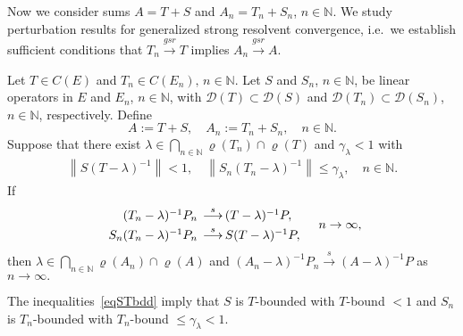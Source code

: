 \documentclass[a4paper,reqno]{amsart}
\begin{document}
{Now we consider sums $A=T+S$ and $A_n=T_n+S_n$, $n\in{\mathbb{N}}$.
We study perturbation results for generalized strong resolvent convergence, i.e.\ we establish sufficient conditions that $T_n{\stackrel{gsr}{\rightarrow}} T$ implies $A_n{\stackrel{gsr}{\rightarrow}} A$.

\begin{theorem}\label{perturbgsr}
Let $T\in C(E)$ and $T_n\in C(E_n), \,n\in{\mathbb{N}}$.
Let  $S$ and $S_n$, $n\in{\mathbb{N}}$, be linear operators in $E$ and $E_n$, $n\in{\mathbb{N}}$, with ${\mathcal D}(T)\subset{\mathcal D}(S)$ and ${\mathcal D}(T_n)\subset{\mathcal D}(S_n)$, $n\in{\mathbb{N}}$, respectively.
Define $$A:=T+S, \quad A_n:=T_n+S_n, \quad n\in{\mathbb{N}}.$$
Suppose that there exist $\lambda\in\underset{n\in{\mathbb{N}}}{\bigcap}\varrho(T_n)\cap\varrho(T)$ 
and $\gamma_\lambda<1$ with
\begin{align}
\left\|S(T-\lambda)^{-1}\right\|<1,\quad \left\|S_n(T_n-\lambda)^{-1}\right\|\leq \gamma_\lambda,\quad n\in{\mathbb{N}}.\label{eqSTbdd}
\end{align}
If
\begin{equation}\begin{array}{rl}(T_n-\lambda)^{-1}P_n \hspace{-2mm}&{\stackrel{s}{\longrightarrow}}\, (T-\lambda)^{-1}P,\\[1mm] S_n(T_n-\lambda)^{-1}P_n \hspace{-2mm}&{\stackrel{s}{\longrightarrow}}\, S(T-\lambda)^{-1}P,\end{array}\quad n\to\infty,\label{eqconvgsrT}\end{equation}
then
$\lambda\in\underset{n\in{\mathbb{N}}}{\bigcap}\varrho(A_n)\cap\varrho(A)$ and  $(A_n-\lambda)^{-1}P_n{\stackrel{s}{\rightarrow}} (A-\lambda)^{-1}P$ as $n\to\infty.$
\end{theorem}

\begin{rem}
 The inequalities~\eqref{eqSTbdd} imply that $S$ is $T$-bounded with $T$-bound $<1$ and $S_n$ is $T_n$-bounded with $T_n$-bound $\leq\gamma_\lambda<1$. 
\end{rem}

}
\end{document}
